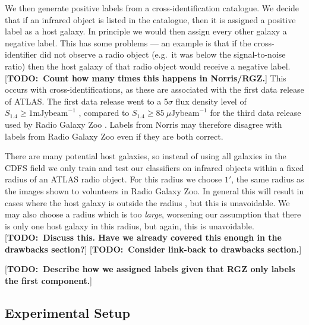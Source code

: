 \documentclass[fleqn,usenatbib,usedcolumn]{mnras}
\newcommand{\text}{\mathrm}
\newcommand{\todo}[1]{ {\color{red}[{\bf TODO:~{#1}}]} }
\begin{document}
    We then generate positive labels from a cross-identification catalogue.
    We decide that if an infrared object is listed in the catalogue, then it
    is assigned a positive label as a host galaxy. In principle we would
    then assign every other galaxy a negative label. This has some problems
    --- an example is that if the cross-identifier did not observe a radio
    object (e.g.~it was below the signal-to-noise ratio) then the host galaxy
    of that radio object would receive a negative label.
    \todo{Count how many times this happens in Norris/RGZ.} This occurs
    with \citet{norris06} cross-identifications, as these are associated with
    the first data release of ATLAS. The first data release went to a
    5$\sigma$ flux density level of $S_{1.4} \geq 1 \text{ mJy beam}^{-1}$
    \citep{norris06}, compared to $S_{1.4} \geq 85\ \mu\text{Jy beam}^{-1}$
    for the third data release used by Radio Galaxy Zoo \citep{franzen15}.
    Labels from Norris may therefore disagree with labels from Radio Galaxy
    Zoo even if they are both correct.

    There are many potential host galaxies, so instead of using all galaxies
    in the CDFS field we only train and test our classifiers on infrared
    objects within a fixed radius of an ATLAS radio object. For this radius we
    choose $1'$, the same radius as the images shown to volunteers in Radio
    Galaxy Zoo. In general this will result in cases where the host galaxy is
    outside the radius \citep[e.g. the giant radio galaxy shown
    in][]{banfield15}, but this is unavoidable. We may also choose a radius
    which is too \emph{large}, worsening our assumption that there is only one
    host galaxy in this radius, but again, this is unavoidable. \todo{Discuss
    this. Have we already covered this enough in the drawbacks section?}
    \todo{Consider link-back to drawbacks section.}

    \todo{Describe how we assigned labels given that RGZ only labels the
    first component.}

  \subsection{Experimental Setup}
  \label{sec:experimental-setup}
\end{document}
